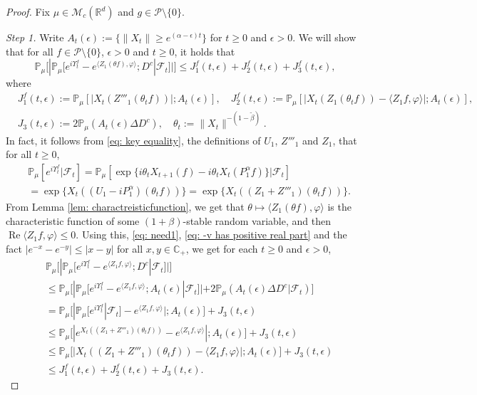 \documentclass[12pt,a4paper]{amsart}
\theoremstyle{plain}
\theoremstyle{definition}
\numberwithin{equation}{section}
\begin{document}
\begin{proof}
  Fix  $\mu \in \mathcal M_c(\mathbb R^d)$ and $g \in \mathcal P\setminus \{0\}$.

  \emph{Step 1.} Write $ A_t(\epsilon) :=\{ \|X_t\| \geq e^{(\alpha - \epsilon)t} \} $ for $t\geq 0$ and $\epsilon > 0$.
  We will show that for all $f\in \mathcal P \setminus \{0\}$, $\epsilon > 0$ and $t\geq 0$, it holds that
  \[
    \mathbb P_\mu \Big[ | \mathbb P_\mu [e^{i\Upsilon^f_t} - e^{\langle Z_1(\theta f), \varphi\rangle}; D^c | \mathscr F_t ]| \Big]
    \leq J^f_1(t,\epsilon)+J^f_2(t,\epsilon)+J^f_3(t,\epsilon),
  \]
where
\begin{align}
\label{eq: Def of Ji}
  &J^f_1(t,\epsilon):= \mathbb{P}_{\mu} [ | X_t(Z'''_1(\theta_t f)) |; A_t(\epsilon) ],
 \quad
  J^f_2(t,\epsilon):= \mathbb{P}_{\mu}[|X_t( Z_1(\theta_t f))-\langle Z_1f, \varphi\rangle |; A_t(\epsilon)],
  \\ & J_3(t,\epsilon):=2\mathbb{P}_{\mu}(A_t (\epsilon)\Delta D^c),
 \quad
   \theta_t := \|X_t\|^{-(1 - \tilde \beta)}.
\end{align}
In fact, it follows from \eqref{eq: key equality}, the definitions of $U_1$, $Z'''_1$ and $Z_1$, that for all $t\geq 0$,
\begin{align}
  \label{eq: need1}
  & \mathbb{P}_{\mu}[e^{i\Upsilon^f_t}|\mathscr{F}_t]
    = \mathbb{P}_{\mu}[\exp\{i\theta_t X_{t+1} (f) - i \theta_t X_t(P_1^\alpha f)\} |\mathscr{F}_{t}] \\
  & = \exp\{X_t((U_1 - iP^\alpha_1 ) (\theta_t f))\}
    = \exp\{X_t((Z_1 + Z'''_1) (\theta_t f))\}.
\end{align}
From Lemma \ref{lem: charactreisticfunction}, we  get that $\theta\mapsto \langle Z_1(\theta f),\varphi\rangle$ is the characteristic function of some $(1+\beta)$-stable random variable, and then  $\operatorname{Re} \langle Z_1f, \varphi\rangle \leq 0$.
Using this, \eqref{eq: need1}, \eqref{eq: -v has positive real part} and the fact $|e^{-x} - e^{-y}| \leq |x-y|$ for all $x,y \in \mathbb C_+$, we get for each $t\geq 0$ and $\epsilon> 0$,
\begin{align}
  \label{eq: inequality that will used later}
  & \mathbb{P}_\mu \Big[ |  \mathbb{P}_\mu [ e^{i\Upsilon^f_t} - e^{\langle Z_1f,\varphi \rangle} ; D^c | \mathscr F_{t}]   |\Big]  \\
  &  \leq \mathbb{P}_\mu   \Big[ |    \mathbb{P}_\mu [ e^{i \Upsilon^f_t }-e^{\langle Z_1f, \varphi\rangle}; A_{t}(\epsilon) | \mathscr F_{t}] |  + 2\mathbb P_\mu ( A_{t}(\epsilon) \Delta D^c | \mathscr F_{t}) \Big] \\
  & = \mathbb{P}_{\mu}\Big[ |\mathbb{P}_\mu [e^{i\Upsilon^f_t}| \mathscr F_{t}]-e^{\langle Z_1f, \varphi\rangle}| ; A_{t}(\epsilon) \Big] + J_3(t,\epsilon) \\
  & \leq \mathbb{P}_\mu \Big[ |e^{X_{t}((Z_1+Z'''_1) (\theta_t f))}-e^{\langle Z_1f, \varphi\rangle} | ; A_{t}(\epsilon) \Big]+  J_3(t,\epsilon) \\
  & \leq \mathbb{P}_\mu \Big[ | X_{t} ( (Z_1+Z'''_1)(\theta_t f)) - \langle Z_1f, \varphi\rangle | ;A_{t}(\epsilon)\Big]+  J_3(t,\epsilon) \\
  & \leq J^f_1(t,\epsilon) + J^f_2(t,\epsilon)+ J_3(t,\epsilon).
\end{align}


\end{proof}
\end{document}
